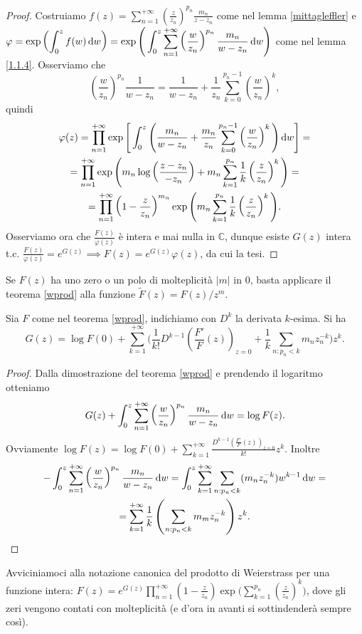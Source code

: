 \begin{proof}
  Costruiamo $\displaystyle f(z)=\sum_{n=1}^{+\infty} \left(\frac{z}{z_n}\right)^{p_n}\frac{m_n}{z-z_n}$ come nel lemma \ref{mittagleffler} e $\displaystyle \varphi=\exp\left(\int_0^z f(w)\mathop{}\!\mathrm{d} w\right)=\exp\Bigg(\int_0^z \sum_{n=1}^{+\infty}\left(\frac{w}{z_n}\right)^{p_n}\frac{m_n}{w-z_n}\mathop{}\!\mathrm{d} w\Bigg)$ come nel lemma \ref{1.1.4}.
  Osserviamo che
  $$\left(\frac{w}{z_n}\right)^{p_n}\frac{1}{w-z_n}=\frac{1}{w-z_n}+\frac{1}{z_n}\sum_{k=0}^{p_n-1}\left(\frac{w}{z_n}\right)^k,$$
  quindi
  \begin{gather*}
    \varphi(z)=\prod_{n=1}^{+\infty} \exp\Bigg[\int_0^z\Bigg(\frac{m_n}{w-z_n}+\frac{m_n}{z_n}\sum_{k=0}^{p_n-1}\left(\frac{w}{z_n}\right)^k\Bigg)\mathop{}\!\mathrm{d} w\Bigg]= \\
    =\prod_{n=1}^{+\infty}\exp\Bigg(m_n\log\left(\frac{z-z_n}{-z_n}\right)+m_n\sum_{k=1}^{p_n}\frac{1}{k}\left(\frac{z}{z_n}\right)^k\Bigg)= \\
    =\prod_{n=1}^{+\infty} \left(1-\frac{z}{z_n}\right)^{m_n}\exp\Bigg(m_n\sum_{k=1}^{p_n}\frac{1}{k}\left(\frac{z}{z_n}\right)^k\Bigg).
  \end{gather*}
  Osserviamo ora che $\frac{F(z)}{\varphi(z)}$ è intera e mai nulla in $\mathbb{C}$, dunque esiste $G(z)$ intera t.c. $\frac{F(z)}{\varphi(z)}=e^{G(z)} \implies F(z)=e^{G(z)}\varphi(z)$, da cui la tesi.
\end{proof}

\begin{oss}
  Se $F(z)$ ha uno zero o un polo di molteplicità $|m|$ in $0$, basta applicare il teorema \ref{wprod} alla funzione $\tilde{F}(z)=F(z)/z^m$.
\end{oss}

\begin{cor} \label{1.1.8}
  Sia $F$ come nel teorema \ref{wprod}, indichiamo con $D^k$ la derivata $k$-esima. Si ha
  $$G(z)=\log{F(0)}+\sum_{k=1}^{+\infty}\Bigg(\frac{1}{k!}D^{k-1}\left(\frac{F'}{F}(z)\right)_{z=0}+\frac{1}{k}\sum_{n:p_n<k}m_nz_n^{-k}\Bigg)z^k.$$
\end{cor}

\begin{proof}
  Dalla dimostrazione del teorema \ref{wprod} e prendendo il logaritmo otteniamo
  $$G(z)+\int_0^z\sum_{n=1}^{+\infty}\left(\frac{w}{z_n}\right)^{p_n}\frac{m_n}{w-z_n}\mathop{}\!\mathrm{d} w=\log{F(z)}.$$
  Ovviamente $\displaystyle \log{F(z)}=\log{F(0)}+\sum_{k=1}^{+\infty} \frac{D^{k-1}\left(\frac{F'}{F}(z)\right)_{z=0}}{k!}z^k$. Inoltre
  \begin{gather*}
    -\int_0^z \sum_{n=1}^{+\infty} \left(\frac{w}{z_n}\right)^{p_n}\frac{m_n}{w-z_n}\mathop{}\!\mathrm{d} w=\int_0^z \sum_{k=1}^{+\infty} \sum_{n: p_n<k} (m_nz_n^{-k})w^{k-1}\mathop{}\!\mathrm{d} w= \\
    =\sum_{k=1}^{+\infty} \frac{1}{k}\left(\sum_{n: p_n<k}m_mz_n^{-k}\right)z^k.
  \end{gather*}
\end{proof}

Avviciniamoci alla notazione canonica del prodotto di Weierstrass per una funzione intera: $\displaystyle F(z)=e^{G(z)}\prod_{n=1}^{+\infty}\left(1-\frac{z}{z_n}\right)\exp\Bigg(\sum_{k=1}^{p_n}\left(\frac{z}{z_n}\right)^k\Bigg)$, dove gli zeri vengono contati con molteplicità (e d'ora in avanti si sottindenderà sempre così).
